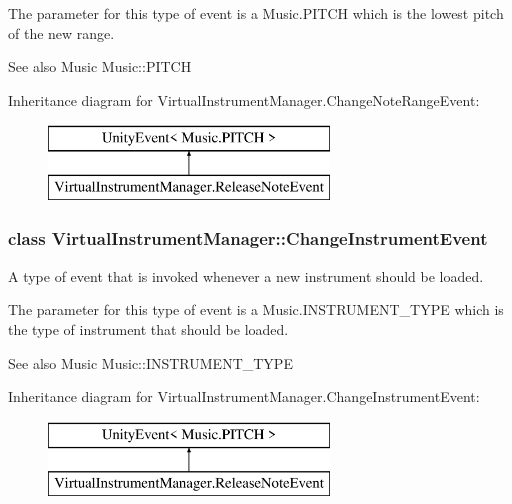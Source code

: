 The parameter for this type of event is a Music.\+P\+I\+T\+CH which is the lowest pitch of the new range.

\begin{DoxySeeAlso}{See also}
Music Music\+::\+P\+I\+T\+CH 
\end{DoxySeeAlso}
Inheritance diagram for Virtual\+Instrument\+Manager.\+Change\+Note\+Range\+Event\+:\begin{figure}[H]
\begin{center}
\leavevmode
\includegraphics[height=2.000000cm]{group___event_types}
\end{center}
\end{figure}
\label{class_virtual_instrument_manager_1_1_change_instrument_event}
\subsubsection{class Virtual\+Instrument\+Manager\+:\+:Change\+Instrument\+Event}
A type of event that is invoked whenever a new instrument should be loaded. 

The parameter for this type of event is a Music.\+I\+N\+S\+T\+R\+U\+M\+E\+N\+T\+\_\+\+T\+Y\+PE which is the type of instrument that should be loaded.

\begin{DoxySeeAlso}{See also}
Music Music\+::\+I\+N\+S\+T\+R\+U\+M\+E\+N\+T\+\_\+\+T\+Y\+PE 
\end{DoxySeeAlso}
Inheritance diagram for Virtual\+Instrument\+Manager.\+Change\+Instrument\+Event\+:\begin{figure}[H]
\begin{center}
\leavevmode
\includegraphics[height=2.000000cm]{group___event_types}
\end{center}
\end{figure}
\label{class_virtual_instrument_manager_1_1_drum_kit_loaded_event}
